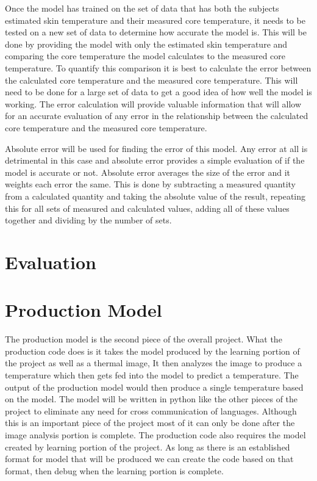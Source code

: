 \documentclass[onecolumn, draftclsnofoot,10pt, compsoc]{IEEEtran}
\begin{document}
Once the model has trained on the set of data that has both the subjects estimated skin temperature and their measured core temperature, it needs to be tested on a new set of data to determine how accurate the model is. This will be done by providing the model with only the estimated skin temperature and comparing the core temperature the model calculates to the measured core temperature. To quantify this comparison it is best to calculate the error between the calculated core temperature and the measured core temperature. This will need to be done for a large set of data to get a good idea of how well the model is working. The error calculation will provide valuable information that will allow for an accurate evaluation of any error in the relationship between the calculated core temperature and the measured core temperature. 

Absolute error will be used for finding the error of this model. Any error at all is detrimental in this case and absolute error provides a simple evaluation of if the model is accurate or not. Absolute error averages the size of the error and it weights each error the same. This is done by subtracting a measured quantity from a calculated quantity and taking the absolute value of the result, repeating this for all sets of measured and calculated values, adding all of these values together and dividing by the number of sets. 


\section{Evaluation}


\section{Production Model}
The production model is the second piece of the overall project. What the production code does is it takes the model produced by the learning portion of the project as well as a thermal image, It then analyzes the image to produce a temperature which then gets fed into the model to predict a temperature. The output of the production model would then produce a single temperature based on the model. The model will be written in python like the other pieces of the project to eliminate any need for cross communication of languages. Although this is an important piece of the project most of it can only be done after the image analysis portion is complete. The production code also requires the model created by learning portion of the project. As long as there is an established format for model that will be produced we can create the code based on that format, then debug when the learning portion is complete.
\end{document}

